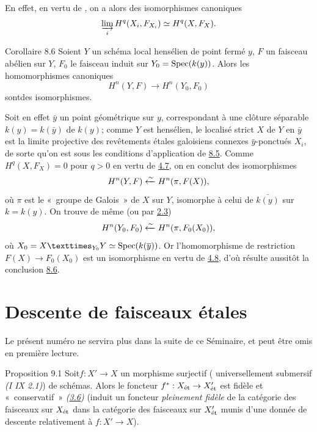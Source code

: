 \documentclass[10pt]{../fichiers-configuration-latex/smfart}
\begin{document}
En effet, en vertu de , on a alors des isomorphismes canoniques
$$
\varinjlim_{i} H^{q}(X_{i},F_{X_{i}})\simeq H^{q}(X,F_{X}){}.
$$

\begin{enonce*}{Corollaire 8.6}
Soient $Y$ un schéma local hensélien de point fermé $y$, $F$ un
faisceau abélien sur $Y$, $F_{0}$ le faisceau induit sur
$Y_{0}=\operatorname{Spec} (k(y))$. Alors les homomorphismes canoniques
$$
H^{n}(Y,F)\longrightarrow H^{n}(Y_{0},F_{0})
$$
sont\pageoriginale  des isomorphismes.
\end{enonce*}

Soit en effet $\bar{y}$ un point géométrique sur $y$, correspondant à
une clôture séparable $k(y)=k(\bar{y})$ de $k(y)$; comme $Y$ est
hensélien, le localisé strict $X$ de $Y$ en $\bar{y}$ est la limite
projective des revêtements étales galoisiens connexes
$\bar{y}$-ponctués $X_{i}$, de sorte qu'on est sous les conditions
d'application de \hyperref[VIII.cor8.5]{8.5}. Comme $H^{q}(X,F_{X})=0$ pour $q>0$ en vertu de
\hyperref[VIII.cor4.7]{4.7}, on en conclut des isomorphismes
$$
H^{n}(Y,F)\xleftarrow{\sim} H^{n}(\pi, F(X)){},
$$
où $\pi$ est le « groupe de Galois » de $X$ sur $Y$, isomorphe à
celui de $\bar{k(y)}$ sur $k=k(y)$. On trouve de même (ou par \hyperref[VIII.cor2.3]{2.3})
$$
H^{n}(Y_{0},F_{0})\xleftarrow{\sim} H^{n}(\pi,F_{0}(X_{0})){},
$$
où $X_{0}=\fprod{X}{Y}{Y_{0}}\simeq \Spec (k(\bar{y}))$. Or
l'homomorphisme de restriction $F(X)\rightarrow F_{0}(X_{0})$ est un
isomorphisme en vertu de \hyperref[VIII.cor4.8]{4.8}, d'où résulte aussitôt la conclusion \hyperref[VIII.cor8.6]{8.6}.

\section{Descente de faisceaux étales}

Le présent numéro ne servira plus dans la suite de ce Séminaire, et
peut être omis en première lecture.

\begin{enonce*}{Proposition 9.1}
Soit\pageoriginale  $f:X'\rightarrow X$ un morphisme surjectif (\resp
universellement submersif \emph{(\SGA I IX 2.1)}) de schémas. Alors le
foncteur $f^{\ast}:X_{\text{\rm ét}}\rightarrow X'_{\text{\rm ét}}$
est fidèle et « conservatif » \emph{(\cf \hyperref[VIII.cor3.6]{3.6})}
(\resp induit un
foncteur \emph{pleinement fidèle} de la catégorie des faisceaux sur
$X_{\text{\rm ét}}$ dans la catégorie des faisceaux sur $X'_{\text{\rm
    ét}}$ munis d'une donnée de descente relativement à
$f:X'\rightarrow X$).
\end{enonce*}
\end{document}
